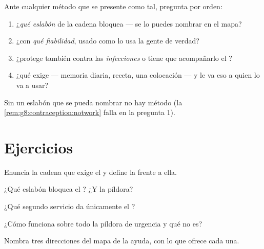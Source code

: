 \begin{method}\label{met:g8:contraception:evaluate}
Ante cualquier método que se presente como tal, pregunta por orden:
\begin{enumerate}
  \item ¿\emph{qué eslabón} de la cadena bloquea --- se lo puedes
        nombrar en el mapa?
  \item ¿con \emph{qué fiabilidad}, usado como lo usa la gente de
        verdad?
  \item ¿protege también contra las \emph{infecciones} o tiene que
        acompañarlo el ?
  \item ¿qué exige --- memoria diaria, receta, una colocación --- y le
        va eso a quien lo va a usar?
\end{enumerate}
Sin un eslabón que se pueda nombrar no hay método (la
\cref{rem:g8:contraception:notwork} falla en la pregunta 1).
\end{method}

\section{Ejercicios}

\begin{exercise}[$\star$]\label{exo:g8:contraception:1}
Enuncia la cadena que exige el  y define la 
frente a ella.
\end{exercise}

\begin{exercise}[$\star$]\label{exo:g8:contraception:2}
¿Qué eslabón bloquea el ? ¿Y la píldora?
\end{exercise}

\begin{exercise}[$\star$]\label{exo:g8:contraception:3}
¿Qué segundo servicio da únicamente el ?
\end{exercise}

\begin{exercise}[$\star$]\label{exo:g8:contraception:4}
¿Cómo funciona sobre todo la píldora de urgencia y qué no es?
\end{exercise}

\begin{exercise}[$\star$]\label{exo:g8:contraception:5}
Nombra tres direcciones del mapa de la ayuda, con lo que ofrece cada
una.
\end{exercise}

